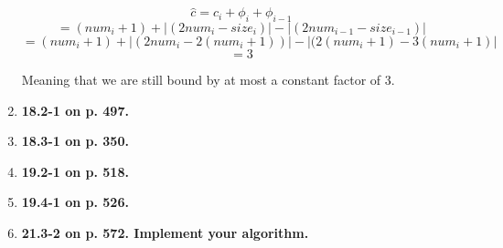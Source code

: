\documentclass{article}
\begin{document}
\begin{enumerate}
    \[\hat{c} = c_i + \phi_i + \phi_{i - 1}\]
    \[= (num_i + 1) + |(2num_i - size_i)| - |(2num_{i - 1} - size_{i - 1})|\]
    \[= (num_i + 1) + |(2num_i - 2(num_i + 1))| - |(2(num_i + 1) - 3(num_i + 1)|\]
    \[= 3\]

    Meaning that we are still bound by at most a constant factor of 3.

    \item \textbf{18.2-1 on p. 497.}
    \item \textbf{18.3-1 on p. 350.}
    \item \textbf{19.2-1 on p. 518.}
    \item \textbf{19.4-1 on p. 526.}
    \item \textbf{21.3-2 on p. 572. Implement your algorithm.}
  \end{enumerate}
\end{document}
